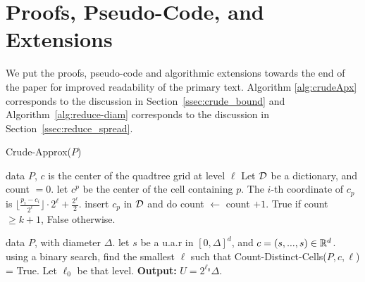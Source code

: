 \section{Proofs, Pseudo-Code, and Extensions}

We put the proofs, pseudo-code and algorithmic extensions towards the end of the paper for improved readability of the primary text.  Algorithm
\ref{alg:crudeApx} corresponds to the discussion in Section~\ref{ssec:crude_bound} and Algorithm~\ref{alg:reduce-diam} corresponds to the discussion in
Section~\ref{ssec:reduce_spread}.

\label{app:pseudoCode}
\begin{algorithm}[tb]
   \caption{Crude-Approx($P$)}
   \label{alg:crudeApx}
\begin{algorithmic}[1]
 \Comment data $P$, $c$ is the center of the quadtree grid at level $\ell$
   \State Let $\mathcal D$ be a dictionary, and count $= 0$.
   \State let $c^p$ be the center of the cell containing $p$. The $i$-th coordinate of $c_p$ is $\lfloor \frac{p_i - c_i}{2^\ell}\rfloor  \cdot 2^\ell + \frac{2^{\ell}}{2}$. 
   \State insert $c_p$ in $\mathcal D$ and do count $\gets$ count $+1$.
   \EndIf
   \EndFor
    True if count $\geq k+1$, False otherwise.
   \EndProcedure
   
    \Comment data $P$, with diameter $\Delta$.
   \State let $s$ be a u.a.r in $[0, \Delta]^d$, and $c = (s,..., s) \in \mathbb{R}^d$.
   \State using a binary search, find the smallest $\ell$ such that Count-Distinct-Cells($P, c, \ell$) = True. Let $\ell_0$ be that level.
   \State \textbf{Output:} $U = 2^{\ell_0} \Delta$.
   \EndProcedure
\end{algorithmic}
\end{algorithm}

